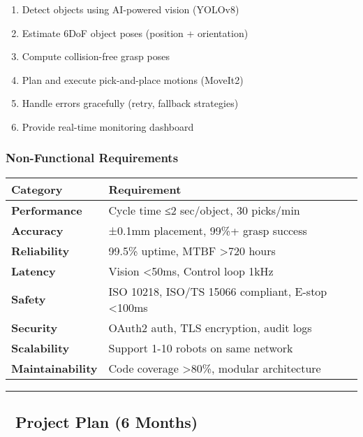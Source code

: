 \documentclass[
]{article}
\providecommand{\tightlist}{%
  \setlength{\itemsep}{0pt}\setlength{\parskip}{0pt}}
\begin{document}
\begin{enumerate}
\def\labelenumi{\arabic{enumi}.}
\tightlist
\item
  Detect objects using AI-powered vision (YOLOv8)
\item
  Estimate 6DoF object poses (position + orientation)
\item
  Compute collision-free grasp poses
\item
  Plan and execute pick-and-place motions (MoveIt2)
\item
  Handle errors gracefully (retry, fallback strategies)
\item
  Provide real-time monitoring dashboard
\end{enumerate}

\hypertarget{non-functional-requirements}{%
\subsubsection{Non-Functional
Requirements}\label{non-functional-requirements}}

\begin{longtable}[]{@{}ll@{}}
\toprule\noalign{}
\textbf{Category} & \textbf{Requirement} \\
\midrule\noalign{}
\endhead
\bottomrule\noalign{}
\endlastfoot
\textbf{Performance} & Cycle time ≤2 sec/object, 30 picks/min \\
\textbf{Accuracy} & ±0.1mm placement, 99\%+ grasp success \\
\textbf{Reliability} & 99.5\% uptime, MTBF \textgreater720 hours \\
\textbf{Latency} & Vision \textless50ms, Control loop 1kHz \\
\textbf{Safety} & ISO 10218, ISO/TS 15066 compliant, E-stop
\textless100ms \\
\textbf{Security} & OAuth2 auth, TLS encryption, audit logs \\
\textbf{Scalability} & Support 1-10 robots on same network \\
\textbf{Maintainability} & Code coverage \textgreater80\%, modular
architecture \\
\end{longtable}

\begin{center}\rule{0.5\linewidth}{0.5pt}\end{center}

\hypertarget{project-plan-6-months}{%
\subsection{🚀 Project Plan (6 Months)}\label{project-plan-6-months}}
\end{document}
